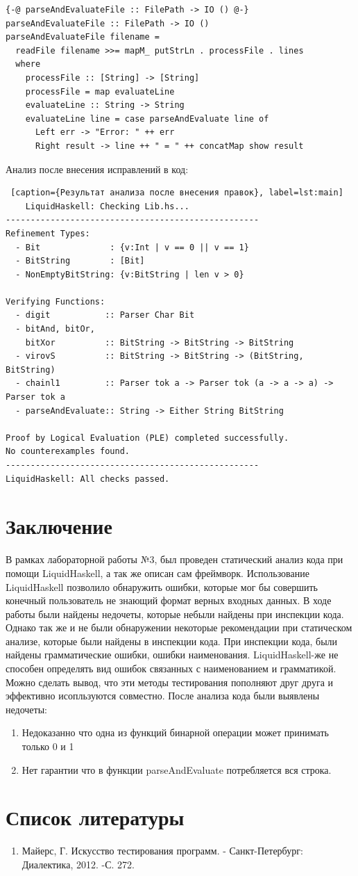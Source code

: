 \documentclass[areasetadvanced]{scrartcl}
\begin{document}
\begin{lstlisting}[caption={Исправленный код}, label=lst:main]
{-@ parseAndEvaluateFile :: FilePath -> IO () @-}
parseAndEvaluateFile :: FilePath -> IO ()
parseAndEvaluateFile filename =
  readFile filename >>= mapM_ putStrLn . processFile . lines
  where
    processFile :: [String] -> [String]
    processFile = map evaluateLine
    evaluateLine :: String -> String
    evaluateLine line = case parseAndEvaluate line of
      Left err -> "Error: " ++ err
      Right result -> line ++ " = " ++ concatMap show result
\end{lstlisting}
Анализ после внесения исправлений в код:
\begin{lstlisting} [caption={Результат анализа после внесения правок}, label=lst:main]
    LiquidHaskell: Checking Lib.hs...
---------------------------------------------------
Refinement Types:
  - Bit              : {v:Int | v == 0 || v == 1}
  - BitString        : [Bit]
  - NonEmptyBitString: {v:BitString | len v > 0}

Verifying Functions:
  - digit           :: Parser Char Bit
  - bitAnd, bitOr, 
    bitXor          :: BitString -> BitString -> BitString
  - virovS          :: BitString -> BitString -> (BitString, BitString)
  - chainl1         :: Parser tok a -> Parser tok (a -> a -> a) -> Parser tok a
  - parseAndEvaluate:: String -> Either String BitString

Proof by Logical Evaluation (PLE) completed successfully.
No counterexamples found.
---------------------------------------------------
LiquidHaskell: All checks passed.
\end{lstlisting}
\newpage 
\section*{Заключение}
В рамках лабораторной работы №3, был проведен статический анализ кода при 
помощи LiquidHaskell, а так же описан сам фреймворк.
Использование LiquidHaskell позволило обнаружить ошибки, которые мог бы совершить конечный пользователь не знающий формат верных входных данных.
В ходе работы были найдены недочеты, которые небыли найдены при инспекции кода. Однако так же и не были обнаружении некоторые рекомендации при статическом анализе, которые были найдены в инспекции кода.
При инспекции кода, были найдены грамматические ошибки, ошибки наименования. LiquidHaskell-же не способен определять вид ошибок связанных с наименованием и грамматикой.
Можно сделать вывод, что эти методы тестирования пополняют друг друга и эффективно исопльзуются совместно.
После анализа кода были выявлены недочеты:
\begin{enumerate}
    \item Недоказанно что одна из функций бинарной операции может принимать только 0 и 1
    \item Нет гарантии что в функции parseAndEvaluate потребляется вся строка.
\end{enumerate}
\newpage
\section*{Список литературы}
\begin{enumerate}
    \item Майерс, Г. Искусство тестирования программ. - Санкт-Петербург: Диалектика, 2012. -С. 272.
\end{enumerate}
\end{document}
